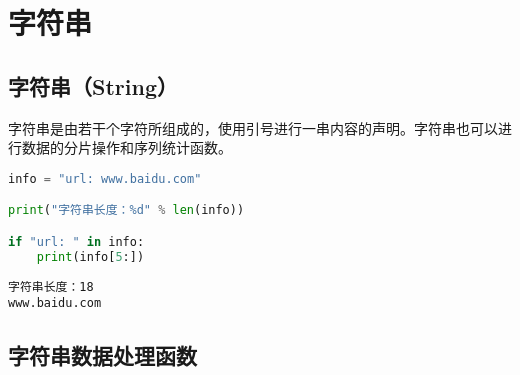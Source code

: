 \newpage

\section{字符串}

\subsection{字符串（String）}

字符串是由若干个字符所组成的，使用引号进行一串内容的声明。字符串也可以进行数据的分片操作和序列统计函数。\\


\begin{lstlisting}[language=Python]
info = "url: www.baidu.com"

print("字符串长度：%d" % len(info))

if "url: " in info:
    print(info[5:])
\end{lstlisting}

\begin{tcolorbox}
	\begin{verbatim}
字符串长度：18
www.baidu.com
\end{verbatim}
\end{tcolorbox}

\vspace{0.5cm}

\subsection{字符串数据处理函数}

\begin{table}[H]
	\centering
	\caption{字符串数据处理函数}
\end{table}


